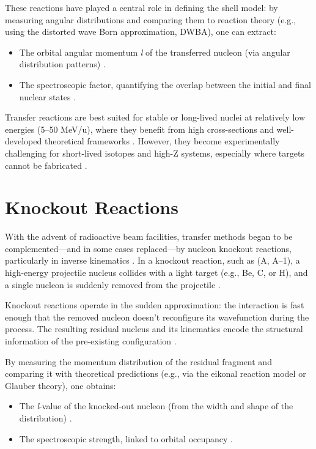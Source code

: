 These reactions have played a central role in defining the shell model: by measuring angular distributions and comparing them to reaction theory (e.g., using the distorted wave Born approximation, DWBA), one can extract:
\begin{itemize}
	\item The orbital angular momentum \emph{l} of the transferred nucleon (via angular distribution patterns) \cite{otsuka_evolution_2020}.
	\item The spectroscopic factor, quantifying the overlap between the initial and final nuclear states \cite{gade_reduction_2008, otsuka_evolution_2020}.
\end{itemize}


Transfer reactions are best suited for stable or long-lived nuclei at relatively low energies (5–50 MeV/u), where they benefit from high cross-sections and well-developed theoretical frameworks \cite{direct_reactions_book}. However, they become experimentally challenging for short-lived isotopes and high-Z systems, especially where targets cannot be fabricated \cite{casten_study_2000}.


\section{Knockout Reactions}

With the advent of radioactive beam facilities, transfer methods began to be complemented—and in some cases replaced—by nucleon knockout reactions, particularly in inverse kinematics \cite{panin_quasi-free_2021}. In a knockout reaction, such as (A, A–1), a high-energy projectile nucleus collides with a light target (e.g., Be, C, or H), and a single nucleon is suddenly removed from the projectile \cite{panin_quasi-free_2019}.

Knockout reactions operate in the sudden approximation: the interaction is fast enough that the removed nucleon doesn't reconfigure its wavefunction during the process. The resulting residual nucleus and its kinematics encode the structural information of the pre-existing configuration \cite{gade_reduction_2008, panin_quasi-free_2021}.

By measuring the momentum distribution of the residual fragment and comparing it with theoretical predictions (e.g., via the eikonal reaction model or Glauber theory), one obtains:

\begin{itemize}
	\item The \emph{l}-value of the knocked-out nucleon (from the width and shape of the distribution) \cite{panin_quasi-free_2021, casten_study_2000}.
	\item The spectroscopic strength, linked to orbital occupancy \cite{panin_quasi-free_2021, gade_reduction_2008}.
\end{itemize}


